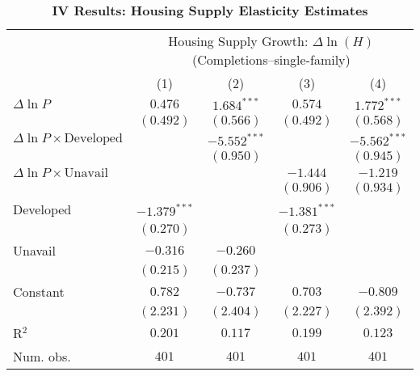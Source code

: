 
\begin{table}[H]
\caption{\textbf{IV Results: Housing Supply Elasticity Estimates}}
\begin{center}
\begin{scriptsize}
\begin{threeparttable}
\begin{tabular}{l c c c c}
\toprule
 & \multicolumn{4}{c}{Housing Supply Growth: $\Delta\ln(H)$ (Completions--single-family)} \\
\cmidrule(lr){2-5}
 & (1) & (2) & (3) & (4) \\
\midrule
$\Delta\ln P$                         & $0.476$        & $1.684^{***}$  & $0.574$        & $1.772^{***}$  \\
                                      & $(0.492)$      & $(0.566)$      & $(0.492)$      & $(0.568)$      \\
$\Delta\ln P\times{\text{Developed}}$ &                & $-5.552^{***}$ &                & $-5.562^{***}$ \\
                                      &                & $(0.950)$      &                & $(0.945)$      \\
$\Delta\ln P\times{\text{Unavail}}$   &                &                & $-1.444$       & $-1.219$       \\
                                      &                &                & $(0.906)$      & $(0.934)$      \\
Developed                             & $-1.379^{***}$ &                & $-1.381^{***}$ &                \\
                                      & $(0.270)$      &                & $(0.273)$      &                \\
Unavail                               & $-0.316$       & $-0.260$       &                &                \\
                                      & $(0.215)$      & $(0.237)$      &                &                \\
Constant                              & $0.782$        & $-0.737$       & $0.703$        & $-0.809$       \\
                                      & $(2.231)$      & $(2.404)$      & $(2.227)$      & $(2.392)$      \\
\midrule
R$^2$                                 & $0.201$        & $0.117$        & $0.199$        & $0.123$        \\
Num. obs.                             & $401$          & $401$          & $401$          & $401$          \\

\end{tabular}
\end{threeparttable}
\end{scriptsize}
\end{center}
\end{table}

